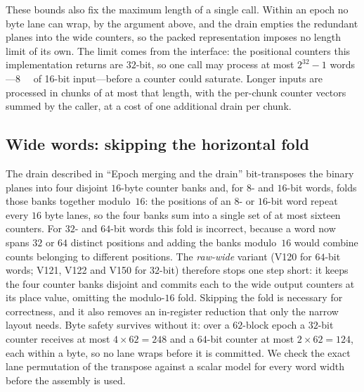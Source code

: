 \documentclass[fleqn,10pt]{wlscirep}
\begin{document}
These bounds also fix the maximum length of a single call. Within an epoch no byte lane can wrap, by the argument above, and the drain empties the redundant planes into the wide counters, so the packed representation imposes no length limit of its own. The limit comes from the interface: the positional counters this implementation returns are $32$-bit, so one call may process at most $2^{32}-1$ words---\SI{8}{\gibi\byte} of 16-bit input---before a counter could saturate. Longer inputs are processed in chunks of at most that length, with the per-chunk counter vectors summed by the caller, at a cost of one additional drain per chunk.

\subsection*{Wide words: skipping the horizontal fold}
The drain described in ``Epoch merging and the drain'' bit-transposes the binary planes into four disjoint $16$-byte counter banks and, for $8$- and $16$-bit words, folds those banks together modulo~$16$: the positions of an $8$- or $16$-bit word repeat every $16$ byte lanes, so the four banks sum into a single set of at most sixteen counters. For $32$- and $64$-bit words this fold is incorrect, because a word now spans $32$ or $64$ distinct positions and adding the banks modulo~$16$ would combine counts belonging to different positions. The \emph{raw-wide} variant (V120 for $64$-bit words; V121, V122 and V150 for $32$-bit) therefore stops one step short: it keeps the four counter banks disjoint and commits each to the wide output counters at its place value, omitting the modulo-$16$ fold. Skipping the fold is necessary for correctness, and it also removes an in-register reduction that only the narrow layout needs. Byte safety survives without it: over a $62$-block epoch a $32$-bit counter receives at most $4\times62=248$ and a $64$-bit counter at most $2\times62=124$, each within a byte, so no lane wraps before it is committed. We check the exact lane permutation of the transpose against a scalar model for every word width before the assembly is used.
\end{document}
